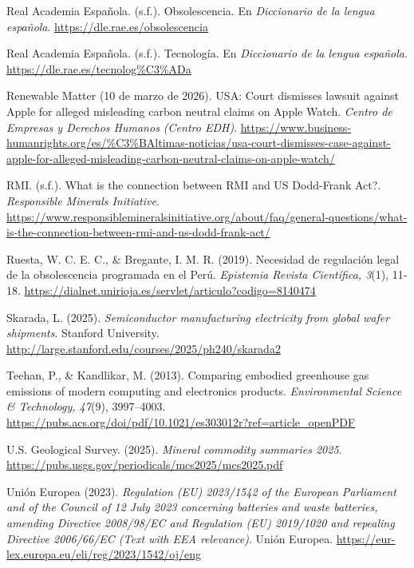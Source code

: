 \documentclass[stu,12pt,a4paper]{apa7}
\begin{document}
\begin{list}{}{
    \setlength{\leftmargin}{1.27cm}
    \setlength{\itemindent}{-1.27cm}  
    \setlength{\parsep}{0pt}       
    \setlength{\itemsep}{0.8em}      
}
\item Real Academia Española. (s.f.). Obsolescencia. En \textit{Diccionario de la lengua española}. \url{https://dle.rae.es/obsolescencia}

\item Real Academia Española. (s.f.). Tecnología. En \textit{Diccionario de la lengua española}. \url{https://dle.rae.es/tecnolog%C3%ADa}

\item Renewable Matter (10 de marzo de 2026). USA: Court dismisses lawsuit against Apple for alleged misleading carbon neutral claims on Apple Watch. \textit{Centro de Empresas y Derechos Humanos (Centro EDH)}. \url{https://www.business-humanrights.org/es/%C3%BAltimas-noticias/usa-court-dismisses-case-against-apple-for-alleged-misleading-carbon-neutral-claims-on-apple-watch/}

\item RMI. (s.f.). What is the connection between RMI and US Dodd-Frank Act?. \textit{Responsible Minerals Initiative}. \url{https://www.responsiblemineralsinitiative.org/about/faq/general-questions/what-is-the-connection-between-rmi-and-us-dodd-frank-act/}

\item Ruesta, W. C. E. C., \& Bregante, I. M. R. (2019). Necesidad de regulación legal de la obsolescencia programada en el Perú. \textit{Epistemia Revista Científica, 3}(1), 11-18. \url{https://dialnet.unirioja.es/servlet/articulo?codigo=8140474}

\item Skarada, L. (2025). \textit{Semiconductor manufacturing electricity from global wafer shipments}. Stanford University. \url{http://large.stanford.edu/courses/2025/ph240/skarada2}

\item Teehan, P., \& Kandlikar, M. (2013). Comparing embodied greenhouse gas emissions of modern computing and electronics products. \textit{Environmental Science \& Technology, 47}(9), 3997–4003. \url{https://pubs.acs.org/doi/pdf/10.1021/es303012r?ref=article_openPDF}

\item U.S. Geological Survey. (2025). \textit{Mineral commodity summaries 2025}. \url{https://pubs.usgs.gov/periodicals/mcs2025/mcs2025.pdf}

\item Unión Europea (2023). \textit{Regulation (EU) 2023/1542 of the European Parliament and of the Council of 12 July 2023 concerning batteries and waste batteries, amending Directive 2008/98/EC and Regulation (EU) 2019/1020 and repealing Directive 2006/66/EC (Text with EEA relevance)}. Unión Europea. \url{https://eur-lex.europa.eu/eli/reg/2023/1542/oj/eng}


\end{list}
\end{document}
